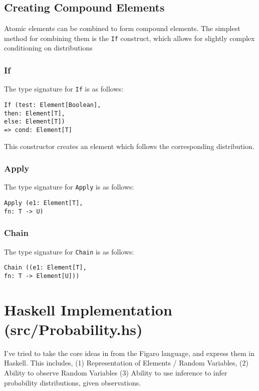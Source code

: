 \documentclass[12pt]{article}
\newcommand{\s}[1]{\texttt{#1}}
\begin{document}
\subsection{Creating Compound Elements}
Atomic elements can be combined to form compound elements. The
simplest method for combining them is the \s{If} construct, which
allows for slightly complex conditioning on distributions

\subsubsection{If}
The type signature for \s{If} is as follows:

\begin{center}
  \s{If (test: Element[Boolean], \\ then: Element[T], \\ else:
    Element[T])\\ => cond: Element[T]}
\end{center}

This constructor creates an element which follows the corresponding distribution.

\subsubsection{Apply}
The type signature for \s{Apply} is as follows:
\begin{center}
  \s{Apply (e1: Element[T], \\ fn: T -> U)}
\end{center}

\subsubsection{Chain}
The type signature for \s{Chain} is as follows:
\begin{center}
  \s{Chain ((e1: Element[T], \\ fn: T -> Element[U]))}
\end{center}

\section{Haskell Implementation (src/Probability.hs)}
I've tried to take the core ideas in from the Figaro language, and express
them in Haskell. This includes, (1) Representation of Elements / Random Variables,
(2) Ability to observe Random Variables (3) Ability to use inference to infer
probability distributions, given observations.
\end{document}
